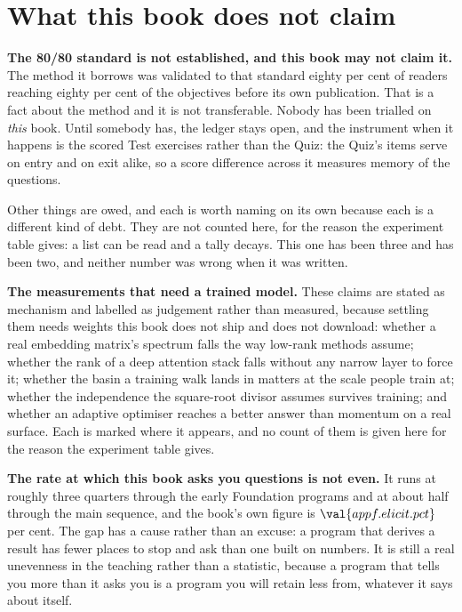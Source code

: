 \section{What this book does not claim}
\label{sec:F-owed}

\begin{warning}
\textbf{The 80/80 standard is not established, and this book may not claim
it.} The method it borrows was validated to that standard \dash{} eighty per
cent of readers reaching eighty per cent of the objectives \dash{} before its
own publication. That is a fact about the method and it is not transferable.
Nobody has been trialled on \emph{this} book. Until somebody has, the ledger
stays open, and the instrument when it happens is the scored Test exercises
rather than the Quiz: the Quiz's items serve on entry and on exit alike, so a
score difference across it measures memory of the questions.
\end{warning}

\medskip
Other things are owed, and each is worth naming on its own because each is a
different kind of debt. They are not counted here, for the reason the
experiment table gives: a list can be read and a tally decays. This one has
been three and has been two, and neither number was wrong when it was written.

\medskip
\textbf{The measurements that need a trained model.} These claims are stated
as mechanism and labelled as judgement rather than measured, because settling
them needs weights this book does not ship and does not download: whether a
real embedding matrix's spectrum falls the way low-rank methods assume;
whether the rank of a deep attention stack falls without any narrow layer to
force it; whether the basin a training walk lands in matters at the scale
people train at; whether the independence the square-root divisor assumes
survives training; and whether an adaptive optimiser reaches a better answer
than momentum on a real surface. Each is marked where it appears, and no
count of them is given here for the reason the experiment table gives.

\medskip
\textbf{The rate at which this book asks you questions is not even.} It runs
at roughly three quarters through the early Foundation programs and at about
half through the main sequence, and the book's own figure is
$\val{appf.elicit.pct}$ per cent. The gap has a cause rather than an excuse: a
program that derives a result has fewer places to stop and ask than one built
on numbers. It is still a real unevenness in the teaching rather than a
statistic, because a program that tells you more than it asks you is a program
you will retain less from, whatever it says about itself.

